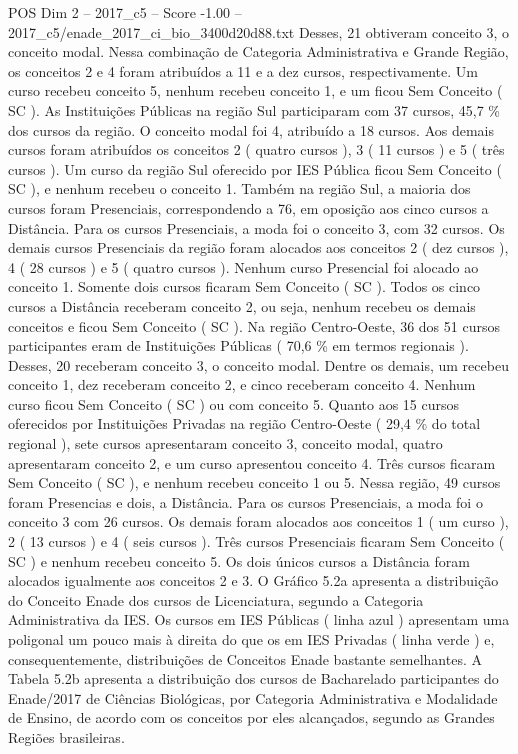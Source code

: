 \begin{textsample}{POS Dim 2 – 2017\_c5 – Score -1.00 – 2017\_c5/enade\_2017\_ci\_bio\_3400d20d88.txt}
Desses, 21 obtiveram conceito 3, o conceito modal.
Nessa combinação de Categoria Administrativa e Grande Região, os conceitos 2 e 4 foram atribuídos a 11 e a dez cursos, respectivamente.
Um curso recebeu conceito 5, nenhum recebeu conceito 1, e um ficou Sem Conceito ( SC ).
As Instituições Públicas na região Sul participaram com 37 cursos, 45,7 \% dos cursos da região.
O conceito modal foi 4, atribuído a 18 cursos.
Aos demais cursos foram atribuídos os conceitos 2 ( quatro cursos ), 3 ( 11 cursos ) e 5 ( três cursos ).
Um curso da região Sul oferecido por IES Pública ficou Sem Conceito ( SC ), e nenhum recebeu o conceito 1.
Também na região Sul, a maioria dos cursos foram Presenciais, correspondendo a 76, em oposição aos cinco cursos a Distância.
Para os cursos Presenciais, a moda foi o conceito 3, com 32 cursos.
Os demais cursos Presenciais da região foram alocados aos conceitos 2 ( dez cursos ), 4 ( 28 cursos ) e 5 ( quatro cursos ).
Nenhum curso Presencial foi alocado ao conceito 1.
Somente dois cursos ficaram Sem Conceito ( SC ).
Todos os cinco cursos a Distância receberam conceito 2, ou seja, nenhum recebeu os demais conceitos e ficou Sem Conceito ( SC ).
Na região Centro-Oeste, 36 dos 51 cursos participantes eram de Instituições Públicas ( 70,6 \% em termos regionais ).
Desses, 20 receberam conceito 3, o conceito modal.
Dentre os demais, um recebeu conceito 1, dez receberam conceito 2, e cinco receberam conceito 4.
Nenhum curso ficou Sem Conceito ( SC ) ou com conceito 5.
Quanto aos 15 cursos oferecidos por Instituições Privadas na região Centro-Oeste ( 29,4 \% do total regional ), sete cursos apresentaram conceito 3, conceito modal, quatro apresentaram conceito 2, e um curso apresentou conceito 4.
Três cursos ficaram Sem Conceito ( SC ), e nenhum recebeu conceito 1 ou 5.
Nessa região, 49 cursos foram Presencias e dois, a Distância.
Para os cursos Presenciais, a moda foi o conceito 3 com 26 cursos.
Os demais foram alocados aos conceitos 1 ( um curso ), 2 ( 13 cursos ) e 4 ( seis cursos ).
Três cursos Presenciais ficaram Sem Conceito ( SC ) e nenhum recebeu conceito 5.
Os dois únicos cursos a Distância foram alocados igualmente aos conceitos 2 e 3.
O Gráfico 5.2a apresenta a distribuição do Conceito Enade dos cursos de Licenciatura, segundo a Categoria Administrativa da IES.
Os cursos em IES Públicas ( linha azul ) apresentam uma poligonal um pouco mais à direita do que os em IES Privadas ( linha verde ) e, consequentemente, distribuições de Conceitos Enade bastante semelhantes.
A Tabela 5.2b apresenta a distribuição dos cursos de Bacharelado participantes do Enade/2017 de Ciências Biológicas, por Categoria Administrativa e Modalidade de Ensino, de acordo com os conceitos por eles alcançados, segundo as Grandes Regiões brasileiras.

\end{textsample}
